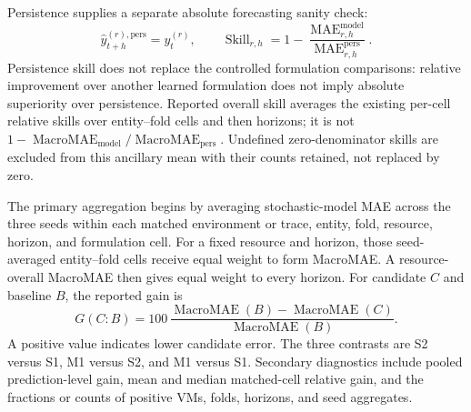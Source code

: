 \documentclass[a4paper,fleqn]{cas-dc}
\begin{document}
Persistence supplies a separate absolute forecasting sanity check:
\begin{equation}
  \widehat{y}_{t+h}^{(r),\mathrm{pers}}=y_t^{(r)},
  \qquad
  \operatorname{Skill}_{r,h}
  =1-\frac{\operatorname{MAE}_{r,h}^{\mathrm{model}}}
           {\operatorname{MAE}_{r,h}^{\mathrm{pers}}}.
  \label{eq:persistence-skill}
\end{equation}
Persistence skill does not replace the controlled formulation comparisons:
relative improvement over another learned formulation does not imply absolute
superiority over persistence. Reported overall skill averages the existing
per-cell relative skills over entity--fold cells and then horizons; it is not
$1-\operatorname{MacroMAE}_{\mathrm{model}}/
\operatorname{MacroMAE}_{\mathrm{pers}}$. Undefined zero-denominator skills
are excluded from this ancillary mean with their counts retained, not
replaced by zero.

The primary aggregation begins by averaging stochastic-model MAE across the
three seeds within each matched environment or trace, entity, fold, resource,
horizon, and formulation cell.  For a fixed resource and horizon, those
seed-averaged entity--fold cells receive equal weight to form MacroMAE. A
resource-overall MacroMAE then gives equal weight to every horizon.  For
candidate $C$ and baseline $B$, the reported gain is
\begin{equation}
  G(C\!:\!B)=100\,
  \frac{\operatorname{MacroMAE}(B)-\operatorname{MacroMAE}(C)}
       {\operatorname{MacroMAE}(B)}.
  \label{eq:macro-gain}
\end{equation}
A positive value indicates lower candidate error.  The three contrasts are S2
versus S1, M1 versus S2, and M1 versus S1.  Secondary diagnostics include
pooled prediction-level gain, mean and median matched-cell relative gain, and
the fractions or counts of positive VMs, folds, horizons, and seed aggregates.
\end{document}
